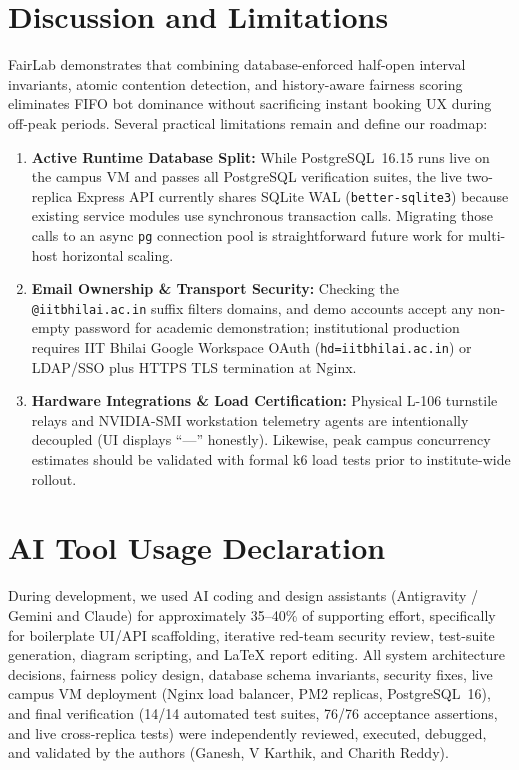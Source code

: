 \documentclass[manuscript,screen,review]{acmart}
\begin{document}
\section{Discussion and Limitations}
\label{sec:discussion}
FairLab demonstrates that combining database-enforced half-open interval invariants, atomic contention detection, and history-aware fairness scoring eliminates FIFO bot dominance without sacrificing instant booking UX during off-peak periods. Several practical limitations remain and define our roadmap:
\begin{enumerate}
  \item \textbf{Active Runtime Database Split:} While PostgreSQL~16.15 runs live on the campus VM and passes all PostgreSQL verification suites, the live two-replica Express API currently shares SQLite WAL (\texttt{better-sqlite3}) because existing service modules use synchronous transaction calls. Migrating those calls to an async \texttt{pg} connection pool is straightforward future work for multi-host horizontal scaling.
  \item \textbf{Email Ownership \& Transport Security:} Checking the \texttt{@iitbhilai.ac.in} suffix filters domains, and demo accounts accept any non-empty password for academic demonstration; institutional production requires IIT Bhilai Google Workspace OAuth (\texttt{hd=iitbhilai.ac.in}) or LDAP/SSO plus HTTPS TLS termination at Nginx.
  \item \textbf{Hardware Integrations \& Load Certification:} Physical L-106 turnstile relays and NVIDIA-SMI workstation telemetry agents are intentionally decoupled (UI displays ``---'' honestly). Likewise, peak campus concurrency estimates should be validated with formal k6 load tests prior to institute-wide rollout.
\end{enumerate}

\section{AI Tool Usage Declaration}
\label{sec:ai-usage}
During development, we used AI coding and design assistants (Antigravity / Gemini and Claude) for approximately 35--40\% of supporting effort, specifically for boilerplate UI/API scaffolding, iterative red-team security review, test-suite generation, diagram scripting, and LaTeX report editing. All system architecture decisions, fairness policy design, database schema invariants, security fixes, live campus VM deployment (Nginx load balancer, PM2 replicas, PostgreSQL~16), and final verification (14/14 automated test suites, 76/76 acceptance assertions, and live cross-replica tests) were independently reviewed, executed, debugged, and validated by the authors (Ganesh, V Karthik, and Charith Reddy).
\end{document}
